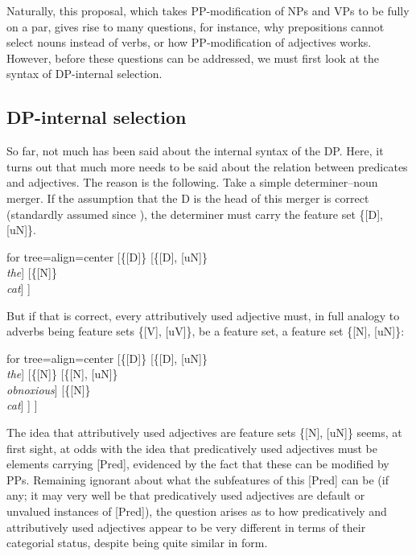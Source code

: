 \documentclass[output=paper
,modfonts
,nonflat]{langsci/langscibook}
\begin{document}
Naturally, this proposal, which takes PP-modification of NPs and VPs to be fully on a par, gives rise to many questions, for instance, why prepositions cannot select nouns instead of verbs, or how PP-modification of adjectives works. However, before these questions can be addressed, we must first look at the syntax of DP-internal selection.

\subsection{DP-internal selection}
So far, not much has been said about the internal syntax of the DP. Here, it turns out that much more needs to be said about the relation between predicates and adjectives. The reason is the following. Take a simple determiner–noun merger. If the assumption that the D is the head of this merger is correct (standardly as\-sumed since \citealt{Abney1987}), the determiner must carry the feature set \{[D], [uN]\}.  

	\begin{exe}
		\ex
			\begin{forest}	for tree={align=center}
				[\{{[}D{]}\}
				[\{{[}D{]}{,} {[}uN{]}\}\\ \textit{the}]
				[\{{[}N{]}\}\\ \textit{cat}] ]
		\end{forest}
	\end{exe}
\noindent But if that is correct, every attributively used adjective must, in full analogy to adverbs being feature sets \{[V], [uV]\}, be a feature set, a feature set \{[N], [uN]\}:

	\begin{exe}
		\ex
			\begin{forest}	for tree={align=center}
				[\{{[}D{]}\}
				[\{{[}D{]}{,} {[}uN{]}\}\\ \textit{the}]
				[\{{[}N{]}\}
				[\{{[}N{]}{,} {[}uN{]}\}\\ \textit{obnoxious}]
				[\{{[}N{]}\}\\ \textit{cat}] ] ] 
		\end{forest}
	\end{exe}
\noindent The idea that attributively used adjectives are feature sets \{[N], [uN]\} seems, at first sight, at odds with the idea that predicatively used adjectives must be elements carrying [Pred], evidenced by the fact that these can be modified by PPs. Remaining ignorant about what the subfeatures of this [Pred] can be (if any; it may very well be that predicatively used adjectives are default or unvalued instances of [Pred]), the question arises as to how predicatively and attributively used adjectives appear to be very different in terms of their categorial status, despite being quite similar in form.
\end{document}
